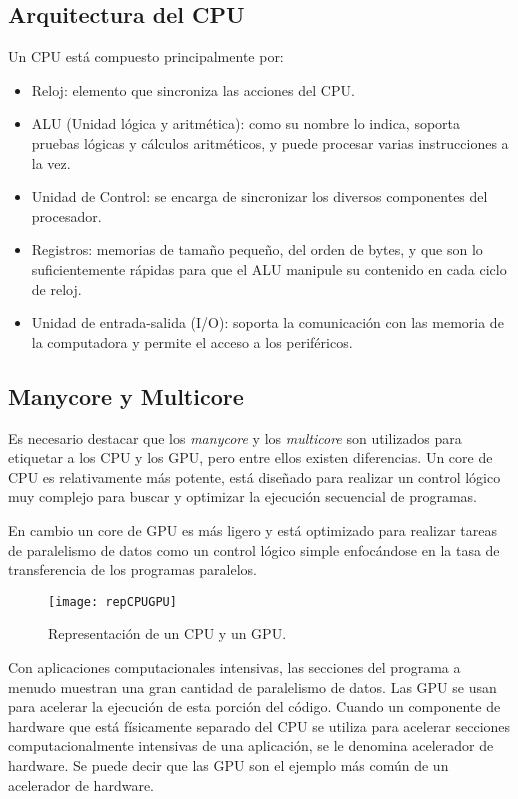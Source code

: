      \subsection{Arquitectura del CPU}

Un CPU está compuesto principalmente por:
\begin{itemize}
\item Reloj: elemento que sincroniza las acciones del CPU.
\item ALU (Unidad lógica y aritmética): como su nombre lo indica, soporta pruebas lógicas y cálculos aritméticos, y puede procesar varias instrucciones a la vez.
\item Unidad de Control: se encarga de sincronizar los diversos componentes del procesador.
\item Registros: memorias de tamaño pequeño, del orden de bytes, y que son lo suficientemente rápidas para que el ALU manipule su contenido en cada ciclo de reloj.
\item Unidad de entrada-salida (I/O): soporta la comunicación con las memoria de la computadora y permite el acceso a los periféricos.
\end{itemize}   

\subsection{Manycore y Multicore}
    Es necesario destacar que los \textit{manycore} y los \textit{multicore} son utilizados para etiquetar a los CPU y los GPU, pero entre ellos existen diferencias. Un core de CPU es relativamente más potente, está diseñado para realizar un control lógico muy complejo para buscar y optimizar la ejecución secuencial de programas.
\newline
    
    En cambio un core de GPU es más ligero y está optimizado para realizar tareas de paralelismo de datos como un control lógico simple enfocándose en la tasa de transferencia de los programas paralelos.
 \newline
 
        \begin{figure}[ht]
      \centering
        \texttt{[image: repCPUGPU]}
        \caption{Representación de un CPU y un GPU\cite{NCUDA}.}
        \label{fig:repgpgpu}
    \end{figure}

    Con aplicaciones computacionales intensivas, las secciones del programa a menudo muestran una gran cantidad de paralelismo de datos. Las GPU se usan para acelerar la ejecución de esta porción del código. Cuando un componente de hardware que está físicamente separado del CPU se utiliza para acelerar secciones computacionalmente intensivas de una aplicación, se le denomina acelerador de hardware. Se puede decir que las GPU son el ejemplo más común de un acelerador de hardware.


